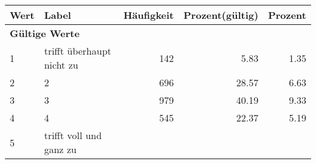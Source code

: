      \begin{longtable}{lXrrr}
     \toprule
     \textbf{Wert} & \textbf{Label} & \textbf{Häufigkeit} & \textbf{Prozent(gültig)} & \textbf{Prozent} \\
     \endhead
     \midrule
     \multicolumn{5}{l}{\textbf{Gültige Werte}}\\

     1 &
     \multicolumn{1}{X}{ trifft überhaupt nicht zu   } &


       \num{142} &
       \num[round-mode=places,round-precision=2]{5.83} &
         \num[round-mode=places,round-precision=2]{1.35} \\

     2 &
     \multicolumn{1}{X}{ 2   } &


       \num{696} &
       \num[round-mode=places,round-precision=2]{28.57} &
         \num[round-mode=places,round-precision=2]{6.63} \\

     3 &
     \multicolumn{1}{X}{ 3   } &


       \num{979} &
       \num[round-mode=places,round-precision=2]{40.19} &
         \num[round-mode=places,round-precision=2]{9.33} \\

     4 &
     \multicolumn{1}{X}{ 4   } &


       \num{545} &
       \num[round-mode=places,round-precision=2]{22.37} &
         \num[round-mode=places,round-precision=2]{5.19} \\

     5 &
     \multicolumn{1}{X}{ trifft voll und ganz zu   } &



\end{longtable}
